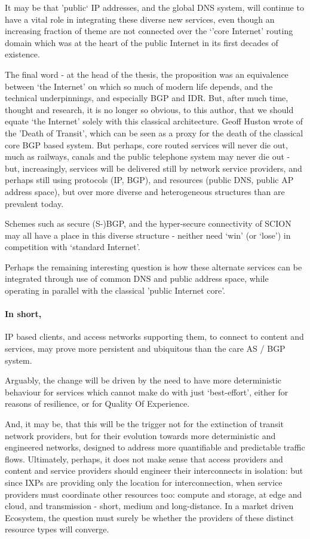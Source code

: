 It may be that 'public` IP addresses, and the global DNS system, will continue to have a vital role in integrating these diverse new services, even though an increasing fraction of theme are not connected over the `'core Internet' routing domain which was at the heart of the public Internet in its first decades of existence.

The final word - at the head of the thesis, the proposition was an equivalence between `the Internet' on which so much of modern life depends, and the technical underpinnings, and especially BGP and IDR.
But, after much time, thought and research, it is no longer so obvious, to this author, that we should equate `the Internet' solely with this classical architecture. Geoff Huston wrote of the 'Death of Transit', which can be seen as a proxy for the death of the classical core BGP based system.  But perhaps, core routed services will never die out, much as railways, canals and the public telephone system may never die out - but, increasingly, services will be delivered still by network service providers, and perhaps still using protocols  (IP, BGP), and resources (public DNS, public AP address space), but over more diverse and heterogeneous structures than are prevalent today.

Schemes such as secure (S-)BGP, and the hyper-secure connectivity of SCION may all have a place in this diverse structure - neither need `win' (or `lose') in competition with `standard Internet'.

Perhaps the remaining interesting question is how these alternate services can be integrated through use of common DNS and public address space, while operating in parallel with the classical 'public Internet core'.

\paragraph{In short,} IP based clients, and access networks supporting them, to connect to content and services, may prove more persistent and ubiquitous than the care AS / BGP system.

Arguably, the change will be driven by the need to have more deterministic behaviour for services which cannot make do with just `best-effort', either for reasons of resilience, or for Quality Of Experience.

And, it may be, that this will be the trigger not for the extinction of transit network providers, but for their evolution towards more deterministic and engineered networks, designed to address more quantifiable and predictable traffic flows.  Ultimately, perhaps, it does not make sense that access providers and content and service providers should engineer their interconnects in isolation: but since IXPs are providing only the location for interconnection, when service providers must coordinate other resources too: compute and storage, at edge and cloud, and transmission - short, medium and long-distance.
In a market driven Ecosystem, the question must surely be whether the providers of these distinct resource types will converge.

